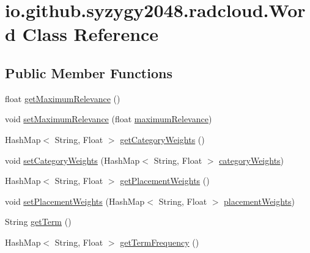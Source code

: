 \hypertarget{classio_1_1github_1_1syzygy2048_1_1radcloud_1_1_word}{}\section{io.\+github.\+syzygy2048.\+radcloud.\+Word Class Reference}
\label{classio_1_1github_1_1syzygy2048_1_1radcloud_1_1_word}
\subsection*{Public Member Functions}
\begin{DoxyCompactItemize}
\item 
float \mbox{\hyperlink{classio_1_1github_1_1syzygy2048_1_1radcloud_1_1_word_a650b6f0273d5d3506f011c755ceb0c2b}{get\+Maximum\+Relevance}} ()
\item 
void \mbox{\hyperlink{classio_1_1github_1_1syzygy2048_1_1radcloud_1_1_word_a8b1e2ce149323bdcabc97acd475ada03}{set\+Maximum\+Relevance}} (float \mbox{\hyperlink{classio_1_1github_1_1syzygy2048_1_1radcloud_1_1_word_aed758b7df9156075124f25815df3f045}{maximum\+Relevance}})
\item 
Hash\+Map$<$ String, Float $>$ \mbox{\hyperlink{classio_1_1github_1_1syzygy2048_1_1radcloud_1_1_word_a43d025c6b84e26e43d860e2039b038b3}{get\+Category\+Weights}} ()
\item 
void \mbox{\hyperlink{classio_1_1github_1_1syzygy2048_1_1radcloud_1_1_word_ad9cc049a275474fb0e07f6936a4f0482}{set\+Category\+Weights}} (Hash\+Map$<$ String, Float $>$ \mbox{\hyperlink{classio_1_1github_1_1syzygy2048_1_1radcloud_1_1_word_ad698485d567053d6752dbec826506744}{category\+Weights}})
\item 
Hash\+Map$<$ String, Float $>$ \mbox{\hyperlink{classio_1_1github_1_1syzygy2048_1_1radcloud_1_1_word_a2ee90d130c2dfc37098cb4e054ca0543}{get\+Placement\+Weights}} ()
\item 
void \mbox{\hyperlink{classio_1_1github_1_1syzygy2048_1_1radcloud_1_1_word_a01c894a4b416e7ec5aad897665d43760}{set\+Placement\+Weights}} (Hash\+Map$<$ String, Float $>$ \mbox{\hyperlink{classio_1_1github_1_1syzygy2048_1_1radcloud_1_1_word_a8023b6dc40adf585ad20ba73ab237bab}{placement\+Weights}})
\item 
String \mbox{\hyperlink{classio_1_1github_1_1syzygy2048_1_1radcloud_1_1_word_a7e81adc8a7bcf0b31ab23629bed42a9a}{get\+Term}} ()
\item 
Hash\+Map$<$ String, Float $>$ \mbox{\hyperlink{classio_1_1github_1_1syzygy2048_1_1radcloud_1_1_word_ae834f3cc726881ca956767761d82910b}{get\+Term\+Frequency}} ()

\end{DoxyCompactItemize}
